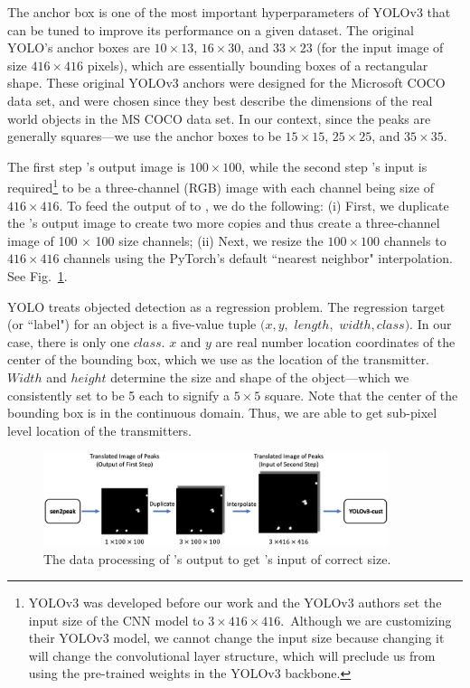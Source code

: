 The anchor box is one of the most important hyperparameters of YOLOv3 that can be tuned to improve
its performance on a given dataset.  The original YOLO's anchor boxes are $10\times13$,  $16\times30$, and $33\times23$ (for
the input image of size $416\times416$ pixels), which are essentially bounding boxes of a rectangular shape. 
These original YOLOv3 anchors were designed for the Microsoft COCO \cite{mscoco} data set, and were chosen
since they best describe the dimensions of the real world objects in the MS COCO data set. In our context,
since the peaks are generally squares---we use the anchor boxes to be $15\times15$, $25\times25$, and $35\times35$.


The first step \imgimg's output image is $100\times100$, while the second step \yolocust's input is required\footnote{YOLOv3 was developed before our work and the YOLOv3 authors set the input size of the CNN model to $3\times416\times416$.~Although we are customizing their YOLOv3 model, we cannot change the input size because changing it will change the convolutional layer structure, which will 
preclude us from using the pre-trained weights in the YOLOv3 backbone.} 
to be a three-channel (RGB) image with each channel being size of $416\times 416$. 
To feed the output of \imgimg to \yolocust, we do the following: (i) First, we duplicate 
the \imgimg's output image to create two more copies and thus create a three-channel image
of 100 $\times$ 100 size channels; (ii) Next, we resize the $100\times100$ channels to $416\times416$ channels using the PyTorch's default ``nearest neighbor" interpolation. See Fig.~\ref{fig:yolo-preprocess}.

YOLO treats objected detection as a regression problem. The regression target (or ``label") for an object is a five-value tuple $(x, y,$ $length,$ $width, class)$. 
In our case, there is only one $class$. 
$x$ and $y$ are real number location coordinates of the center of the bounding box, which we use as the location of the transmitter. 
$Width$ and $height$ determine the size and shape of the object---which we consistently set to be 5 each to signify a $5\times5$ square. 
Note that the center of the bounding box is in the continuous domain. 
Thus, we are able to get sub-pixel level location of the transmitters.


\begin{figure}[t]
	\centering
	\includegraphics[width=0.9\textwidth]{chapters/wowmom-pmc/figures/yolo-preprocess.png}
	\vspace{-0.1in}
	\caption{The data processing of \imgimg's output to get \yolocust's input of correct size.}
	\label{fig:yolo-preprocess}
\end{figure}



